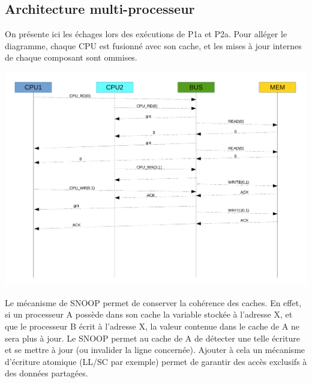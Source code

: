 \documentclass[a4paper, 11pt]{article}
\begin{document}
\subsection{Architecture multi-processeur}
On présente ici les échages lors des exécutions de P1a et P2a. Pour alléger le
diagramme, chaque CPU est fusionné avec son cache, et les mises à jour internes
de chaque composant sont ommises.
\begin{center}
\centerline{\includegraphics[scale=0.5]{images/seq2.pdf}}
\end{center}
Le mécanisme de SNOOP permet de conserver la cohérence des caches. En effet,
si un processeur A possède dans son cache la variable stockée à l'adresse X,
et que le processeur B écrit à l'adresse X, la valeur contenue dans le cache
de A ne sera plus à jour. Le SNOOP permet au cache de A de détecter une telle
écriture et se mettre à jour (ou invalider la ligne concernée). Ajouter à
cela un mécanisme d'écriture atomique (LL/SC par exemple) permet de garantir
des accès exclusifs à des données partagées.
\end{document}
